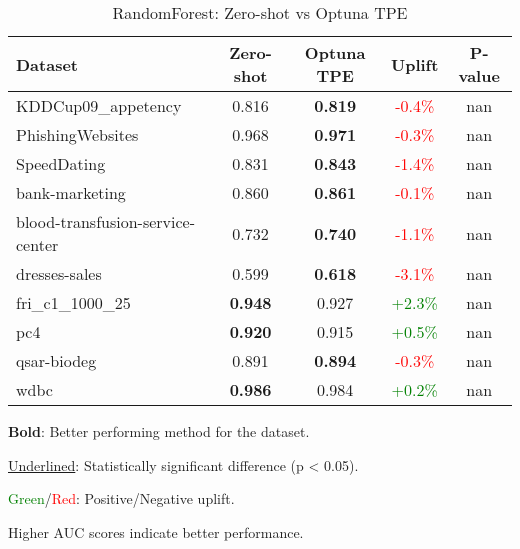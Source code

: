 \begin{table}[htbp]
\centering
\caption{RandomForest: Zero-shot vs Optuna TPE}
\label{tab:randomforest_zeroshot_vs_optuna}
\begin{tabular}{lcccc}
\toprule
Dataset & Zero-shot & Optuna TPE & Uplift & P-value \\
\midrule
KDDCup09\_appetency & 0.816 & \textbf{0.819} & \textcolor{red}{-0.4\%} & nan \\
PhishingWebsites & 0.968 & \textbf{0.971} & \textcolor{red}{-0.3\%} & nan \\
SpeedDating & 0.831 & \textbf{0.843} & \textcolor{red}{-1.4\%} & nan \\
bank-marketing & 0.860 & \textbf{0.861} & \textcolor{red}{-0.1\%} & nan \\
blood-transfusion-service-center & 0.732 & \textbf{0.740} & \textcolor{red}{-1.1\%} & nan \\
dresses-sales & 0.599 & \textbf{0.618} & \textcolor{red}{-3.1\%} & nan \\
fri\_c1\_1000\_25 & \textbf{0.948} & 0.927 & \textcolor{green}{+2.3\%} & nan \\
pc4 & \textbf{0.920} & 0.915 & \textcolor{green}{+0.5\%} & nan \\
qsar-biodeg & 0.891 & \textbf{0.894} & \textcolor{red}{-0.3\%} & nan \\
wdbc & \textbf{0.986} & 0.984 & \textcolor{green}{+0.2\%} & nan \\
\bottomrule
\end{tabular}
\begin{tablenotes}
\small
\item \textbf{Bold}: Better performing method for the dataset.
\item \underline{Underlined}: Statistically significant difference (p < 0.05).
\item \textcolor{green}{Green}/\textcolor{red}{Red}: Positive/Negative uplift.
\item Higher AUC scores indicate better performance.
\end{tablenotes}
\end{table}